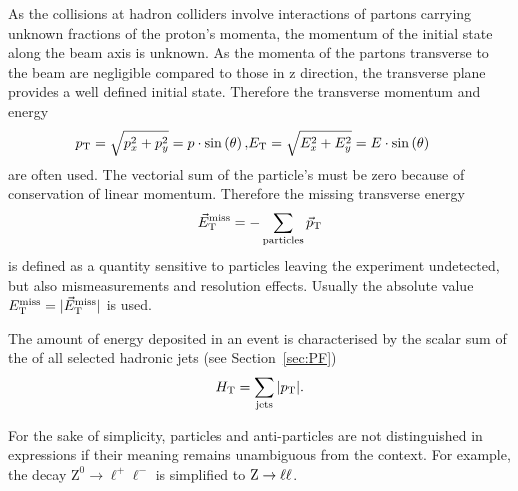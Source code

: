 As the collisions at hadron colliders involve interactions of partons carrying unknown fractions of the proton's momenta, the momentum of the initial state along the beam axis is unknown. As the momenta of the partons transverse to the beam are negligible compared to those in z direction, the transverse plane provides a well defined initial state. Therefore the transverse momentum and energy
\begin{eqnarray}
p_{\mathrm{T}} = \sqrt{p_x^2  + p_y^2} = p\cdot \sin\left(\theta\right), & E_{\mathrm{T}} = \sqrt{E_x^2  + E_y^2} = E\cdot \sin\left(\theta\right)
\end{eqnarray}
are often used. The vectorial sum of the particle's \pt must be zero because of conservation of linear momentum. Therefore the missing transverse energy 
\begin{equation}
\vec{E}_{\mathrm{T}}^{\mathrm{miss}} = - \sum\limits_{\text{particles}} \vec{p}_{\mathrm{T}}
\end{equation}
is defined as a quantity sensitive to particles leaving the experiment undetected, but also mismeasurements and resolution effects. Usually the absolute value $E_{\mathrm{T}}^{\mathrm{miss}} = \vert \vec{E}_{\mathrm{T}}^{\mathrm{miss}} \vert$ is used.

The amount of energy deposited in an event is characterised by the scalar sum of the \pt of all selected hadronic jets (see Section~\ref{sec:PF}) 
\begin{equation}
H_\mathrm{T} = \sum\limits_{\text{jets}} \vert p_{\mathrm{T}} \vert.
\end{equation}

For the sake of simplicity, particles and anti-particles are not distinguished in expressions if their meaning remains unambiguous from the context. For example, the decay $\mathrm{Z}^0 \rightarrow \ell^+\ell^-$ is simplified to $\mathrm{Z} \rightarrow \ell\ell$.
